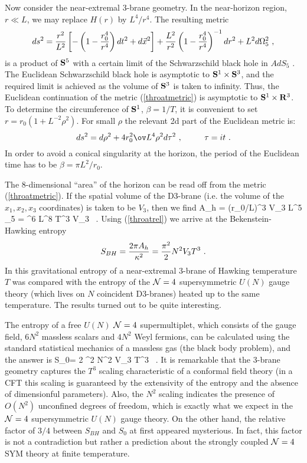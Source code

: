Now consider the near-extremal 3-brane geometry. In the near-horizon region,
$r \ll L$, we may replace $H(r)$ by $L^4/r^4$. 
The resulting metric 
\begin{equation}
\label{throatmetric}
   ds^2 = {r^2 \over L^2} 
    \left[ -  \left (1- {r_0^4\over r^4} \right )
dt^2 + d\vec{x}^2 \right] +
    {L^2 \over r^2} 
  \left  ( 1- {r_0^4\over r^4} \right )^{-1}  dr^2 + L^2 d\Omega_5^2 \ ,
\end{equation}
is a product of ${\bf S}^5$  with  a  certain
limit of the Schwarzschild black hole in $AdS_5$
 \cite{newWit}. The Euclidean Schwarzschild black hole is asymptotic to
${\bf S}^1\times {\bf S}^3$, and the required limit is 
achieved as the volume of
${\bf S}^3$ is taken to infinity. Thus, the Euclidean continuation of
the metric (\ref{throatmetric}) is asymptotic to 
${\bf S}^1\times {\bf R}^3$. 
To determine the circumference
of ${\bf S}^1$, $\beta=1/T$, it is convenient 
to set $r= r_0(1  + L^{-2} \rho^2)$. For small $\rho$ 
the relevant 2d  part of the Euclidean  metric is:
\begin{equation}
ds^2 = d\rho^2 + {4r_0^2\ov L^4} \rho^2 d\tau^2\ , \ \  \qquad \tau=it \ .
\end{equation}
In order to avoid a conical singularity at the horizon,
the period of the Euclidean time
has to be $\beta = \pi L^2/r_0$.

The 8-dimensional ``area'' of the horizon can be read off from the
metric (\ref{throatmetric}). If the spatial volume of the D3-brane (i.e.
the volume of the $x_1, x_2, x_3$ coordinates) is taken to be $V_3$,
then we find
\be
A_h = (r_0/L)^3 V_3 L^5 \Omega_5 = \pi^6 L^8 T^3 V_3 \ .
\ee 
Using (\ref{throatrel}) we arrive at the Bekenstein-Hawking
entropy \cite{gkp}
\begin{equation}
\label{bhe}
S_{BH}= {2\pi A_h\over \kappa^2} = {\pi^2\over 2} N^2 V_3 T^3
\ .
\end{equation}
In \cite{gkp} this gravitational entropy of a near-extremal
3-brane of Hawking temperature $T$ was compared with the entropy
of the ${\cal N}=4$ supersymmetric $U(N)$ gauge theory (which lives
on $N$ coincident D3-branes) heated up to the same temperature. 
The results turned out to be quite interesting.

The entropy of a free $U(N)$ ${\cal N}=4$
supermultiplet, which consists of the gauge field, $6 N^2$ massless
scalars and $4 N^2$ Weyl fermions, can be calculated using
the standard statistical mechanics of a massless gas (the black body 
problem), and the answer is
\be \label{ffc}
S_0= {2 \pi^2} N^2 V_3 T^3
\ .
\ee
It is remarkable that the 3-brane geometry
captures the $T^3$ scaling characteristic of a conformal
field theory (in a CFT this scaling is guaranteed by the extensivity of
the entropy and the absence of dimensionful parameters).
Also, the $N^2$ scaling indicates the presence of $O(N^2)$
unconfined degrees of freedom, which is exactly what we expect in
the ${\cal N}=4$ supersymmetric $U(N)$ gauge theory.
On the other hand, the relative factor of $3/4$ between $S_{BH}$ and
$S_0$ at first appeared mysterious.
In fact, this factor
is not a contradiction but rather a prediction about the strongly
coupled ${\cal N}=4$ SYM theory at finite temperature. 

